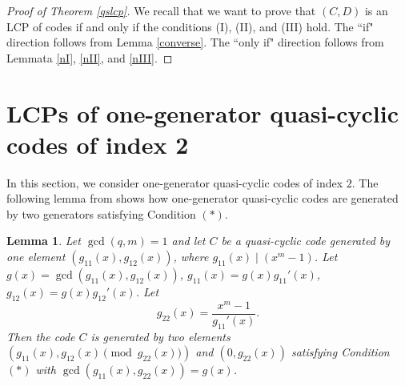 \documentclass[12 pt]{extarticle}
\numberwithin{equation}{section}
\newtheorem{lemma}[theorem]{Lemma}
\theoremstyle{definition}
\begin{document}
\begin{proof}[Proof of Theorem \ref{qslcp}]
 We recall that we want to prove that $(C,D)$ is an LCP of codes if and only if the conditions (I), (II), and  (III) hold. The ``if" direction follows from Lemma \ref{converse}. The ``only if" direction follows from Lemmata \ref{nI}, \ref{nII}, and \ref{nIII}.
    
\end{proof}




\section{ LCPs of one-generator quasi-cyclic codes  of index 2}\label{secgen1lcp}

In this section, we consider one-generator quasi-cyclic codes of index $2$.
The following lemma from \cite[Lemma 2.4]{Abdukhalikov20252} shows how one-generator quasi-cyclic codes are generated by two generators satisfying Condition $(\ast)$.

\begin{lemma} \label{lemma1gen} 
Let $\gcd(q,m)=1$ and let $C$ be a quasi-cyclic code generated by one element $(g_{11}(x),g_{12}(x))$, where $g_{11}(x) \mid (x^m-1)$.  
Let $g(x)=\gcd(g_{11}(x),g_{12}(x))$, $g_{11}(x)=g(x)g_{11}'(x)$, $g_{12}(x)=g(x)g_{12}'(x)$. 
Let 
\[
g_{22}(x) = \dfrac{x^m-1}{g_{11}'(x)}.
\]
Then the code $C$ is generated by two elements $(g_{11}(x),g_{12}(x) \pmod{g_{22}(x)})$ and $(0,g_{22}(x))$ satisfying Condition $(\ast)$ with
 $\gcd(g_{11}(x),g_{22}(x))=g(x)$.
\end{lemma}
\end{document}
